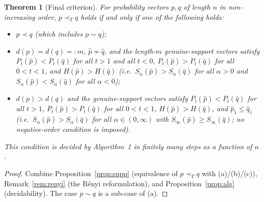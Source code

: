 \documentclass{amsart}
\theoremstyle{plain}
\newtheorem{theorem}{Theorem}
\theoremstyle{definition}
\newcommand{\maj}{\prec}
\newcommand{\trump}{\prec_T}
\begin{document}
\begin{theorem}[Final criterion]\label{thm:final}
For probability vectors $p,q$ of length $n$ in non-increasing order, $p\trump q$ holds
if and only if one of the following holds:
\begin{itemize}
\item[\textnormal{(a)}] $p\maj q$ (which includes $p\sim q$);
\item[\textnormal{(b)}] $d(p)=d(q)=:m$, $\hat p\not\sim\hat q$, and the length-$m$
genuine-support vectors satisfy $P_t(\hat p)<P_t(\hat q)$ for all $t>1$ and all $t<0$,
$P_t(\hat p)>P_t(\hat q)$ for all $0<t<1$, and $H(\hat p)>H(\hat q)$ \textnormal{(}i.e.\
$S_\alpha(\hat p)>S_\alpha(\hat q)$ for all $\alpha>0$ and $S_\alpha(\hat p)<
S_\alpha(\hat q)$ for all $\alpha<0$\textnormal{)};
\item[\textnormal{(c)}] $d(p)>d(q)$ and the genuine-support vectors satisfy
$P_t(\hat p)<P_t(\hat q)$ for all $t>1$, $P_t(\hat p)>P_t(\hat q)$ for all $0<t<1$,
$H(\hat p)>H(\hat q)$, and $\hat p_1\le\hat q_1$ \textnormal{(}i.e.\
$S_\alpha(\hat p)>S_\alpha(\hat q)$ for all $\alpha\in(0,\infty)$ with
$S_\infty(\hat p)\ge S_\infty(\hat q)$; \emph{no} negative-order condition is
imposed\textnormal{)}.
\end{itemize}
This condition is decided by Algorithm~1 in finitely many steps as a function of $n$.
\end{theorem}
\begin{proof}
Combine Proposition~\ref{prop:supp} (equivalence of $p\trump q$ with (a)/(b)/(c)),
Remark~\ref{rem:renyi} (the R\'enyi reformulation), and Proposition~\ref{prop:alg}
(decidability). The case $p\sim q$ is a sub-case of (a).
\end{proof}
\end{document}
